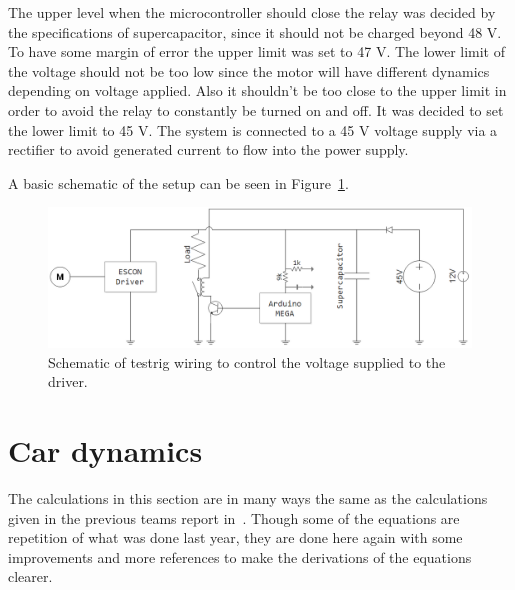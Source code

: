The upper level when the microcontroller should close the relay was decided by the specifications of supercapacitor, since it should not be charged beyond 48 V. To have some margin of error the upper limit was set to 47 V. The lower limit of the voltage should not be too low since the motor will have different dynamics depending on voltage applied. Also it shouldn't be too close to the upper limit in order to avoid the relay to constantly be turned on and off. It was decided to set the lower limit to 45 V. The system is connected to a 45 V voltage supply via a rectifier to avoid generated current to flow into the power supply.

A basic schematic of the setup can be seen in
Figure~\ref{fig:testrig_schematic}.

\begin{figure}[H]
    \centering
    \includegraphics[width=\textwidth]{./img/testrig_schematic.png}
    \caption{Schematic of testrig wiring to control the voltage supplied to the driver.}\label{fig:testrig_schematic}
\end{figure}

\section{Car dynamics}\label{sec:cardynamics}
The calculations in this section are in many ways the same as the calculations
given in the previous teams report in~\cite{elba2015}. Though some
of the equations are repetition of what was done last year, they are
done here again with some improvements and more references to make the
derivations of the equations clearer.

